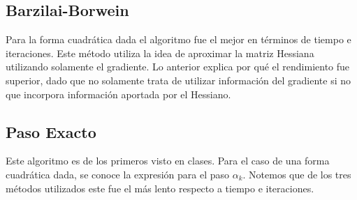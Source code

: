 \documentclass[11pt,letterpaper]{article}
\theoremstyle{definition}
\theoremstyle{definition}
\theoremstyle{definition}
\begin{document}
	\subsection{Barzilai-Borwein}
	Para la forma cuadrática dada el algoritmo fue el mejor en términos de tiempo e iteraciones. Este método utiliza la idea de aproximar la matriz Hessiana utilizando solamente el gradiente. Lo anterior explica por qué el rendimiento fue superior, dado que no solamente trata de utilizar información del gradiente si no que incorpora información aportada por el Hessiano.
	\subsection{Paso Exacto}
	Este algoritmo es de los primeros visto en clases. Para el caso de una forma cuadrática dada, se conoce la expresión para el paso $ \alpha_k $. Notemos que de los tres métodos utilizados este fue el más lento respecto a tiempo e iteraciones. 
\end{document}
